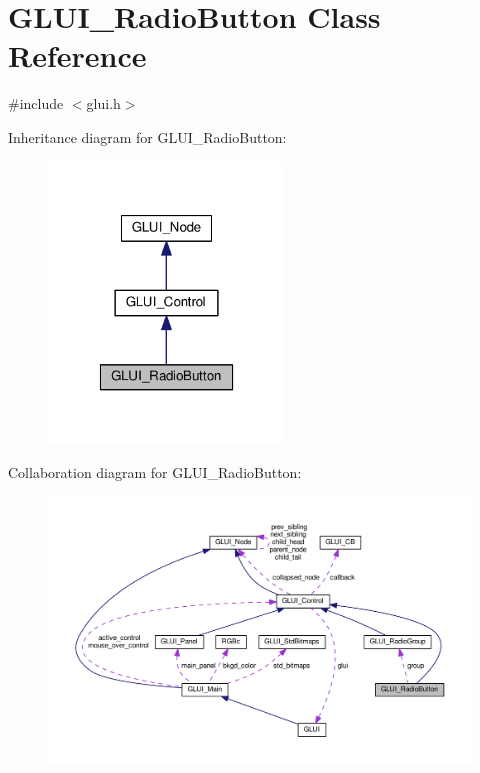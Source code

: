 \hypertarget{class_g_l_u_i___radio_button}{\section{G\+L\+U\+I\+\_\+\+Radio\+Button Class Reference}
\label{class_g_l_u_i___radio_button}
}


{\ttfamily \#include $<$glui.\+h$>$}



Inheritance diagram for G\+L\+U\+I\+\_\+\+Radio\+Button\+:\nopagebreak
\begin{figure}[H]
\begin{center}
\leavevmode
\includegraphics[width=178pt]{class_g_l_u_i___radio_button__inherit__graph}
\end{center}
\end{figure}


Collaboration diagram for G\+L\+U\+I\+\_\+\+Radio\+Button\+:\nopagebreak
\begin{figure}[H]
\begin{center}
\leavevmode
\includegraphics[width=350pt]{class_g_l_u_i___radio_button__coll__graph}
\end{center}
\end{figure}
